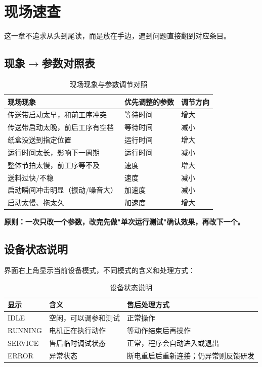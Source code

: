 \section{现场速查}

这一章不追求从头到尾读，而是放在手边，遇到问题直接翻到对应条目。

\subsection{现象$\rightarrow$参数对照表}

\begin{table}[H]
    \centering
    \caption{现场现象与参数调节对照}
    \label{tab:symptom-param}
    \begin{tabular}{p{5.5cm}lp{3cm}}
        \toprule
        \textbf{现场现象} & \textbf{优先调整的参数} & \textbf{调节方向} \\
        \midrule
        传送带启动太早，和前工序冲突 & 等待时间 & 增大 \\
        传送带启动太晚，前后工序有空档 & 等待时间 & 减小 \\
        纸盒没送到指定位置 & 运行时间 & 增大 \\
        运行时间太长，影响下一周期 & 运行时间 & 减小 \\
        整体节拍太慢，前工序等不及 & 速度 & 增大 \\
        送料过快/不稳 & 速度 & 减小 \\
        启动瞬间冲击明显（振动/噪音大） & 加速度 & 减小 \\
        启动太慢、拖太久 & 加速度 & 增大 \\
        \bottomrule
    \end{tabular}
\end{table}

\textbf{原则：一次只改一个参数，改完先做"单次运行测试"确认效果，再改下一个。}

\subsection{设备状态说明}

界面右上角显示当前设备模式，不同模式的含义和处理方式：

\begin{table}[H]
    \centering
    \caption{设备状态说明}
    \label{tab:device-status}
    \begin{tabular}{lp{4.5cm}p{5cm}}
        \toprule
        \textbf{显示} & \textbf{含义} & \textbf{售后处理方式} \\
        \midrule
        IDLE & 空闲，可以调参和测试 & 正常操作 \\
        RUNNING & 电机正在执行动作 & 等动作结束后再操作 \\
        SERVICE & 售后临时调试状态 & 正常，程序会自动进入或退出 \\
        ERROR & 异常状态 & 断电重启后重新连接；仍异常则反馈研发 \\
        \bottomrule
    \end{tabular}
\end{table}

